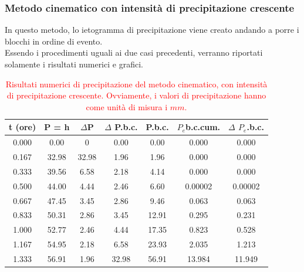 \subsubsection{Metodo cinematico con intensità di precipitazione crescente}
In questo metodo, lo ietogramma di precipitazione viene creato andando a porre i blocchi in ordine di evento.\\
Essendo i procedimenti uguali ai due casi precedenti, verranno riportati solamente i risultati numerici e grafici.
\begin{table}[H] \centering
    \caption{\textcolor{red}{Risultati numerici di precipitazione del metodo cinematico, con intensità di precipitazione crescente. Ovviamente, i valori di precipitazione hanno come unità di misura i $mm$.}}
    \begin{tabular}{ccccccc}
        \toprule
    t (ore)   & P = h & $\Delta$P & $\Delta$ P.b.c. & P.b.c. & $P_e$b.c.cum. & $\Delta$ $P_e$.b.c. \\
    \midrule
    0.000     & 0.00                 & 0                    & 0.00              & 0.00                & 0.000                & 0.000              \\
    0.167     & 32.98                & 32.98                & 1.96              & 1.96                & 0.000                & 0.000              \\
    0.333 & 39.56                & 6.58                 & 2.18              & 4.14                & 0.000                & 0.000              \\
    0.500     & 44.00                & 4.44                 & 2.46              & 6.60                & 0.00002              & 0.00002            \\
    0.667     & 47.45                & 3.45                 & 2.86              & 9.46                & 0.063                & 0.063              \\
    0.833     & 50.31                & 2.86                 & 3.45              & 12.91               & 0.295                & 0.231              \\
    1.000     & 52.77                & 2.46                 & 4.44              & 17.35               & 0.823                & 0.528              \\
    1.167     & 54.95                & 2.18                 & 6.58              & 23.93               & 2.035                & 1.213              \\
    1.333     & 56.91                & 1.96                 & 32.98             & 56.91               & 13.984               & 11.949            \\
    \bottomrule
    \end{tabular}
    \end{table}

